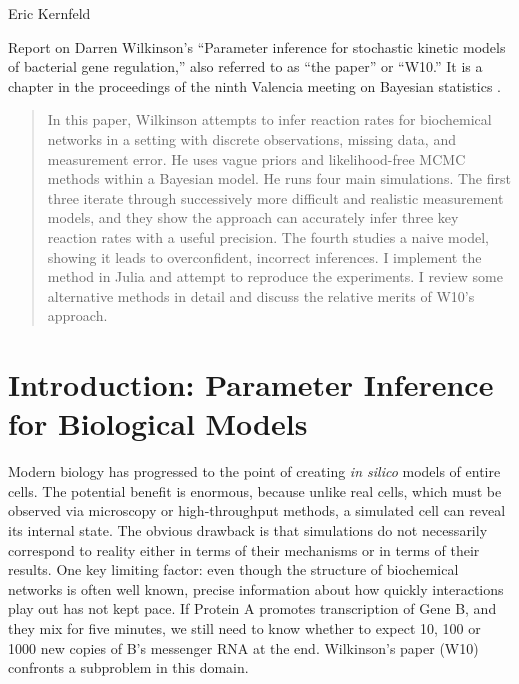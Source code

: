 \documentclass{article}
\begin{document}
Eric Kernfeld

Report on Darren Wilkinson's ``Parameter inference for stochastic kinetic models of bacterial gene regulation,'' also referred to as ``the paper'' or ``W10.'' It is a chapter in the proceedings of the ninth Valencia meeting on Bayesian statistics \cite{Bernardo2012}. 

\begin{abstract}
In this paper, Wilkinson attempts to infer reaction rates for biochemical networks in a setting with discrete observations, missing data, and measurement error. He uses vague priors and likelihood-free MCMC methods within a Bayesian model. He runs four main simulations. The first three iterate through successively more difficult and realistic measurement models, and they show the approach can accurately infer three key reaction rates with a useful precision. The fourth studies a naive model, showing it leads to overconfident, incorrect inferences. I implement the method in Julia and attempt to reproduce the experiments. I review some alternative methods in detail and discuss the relative merits of W10's approach.
\end{abstract}

\tableofcontents
\newpage


\section{Introduction: Parameter Inference for Biological Models}

Modern biology has progressed to the point of creating {\it in silico} models of entire cells. The potential benefit is enormous, because unlike real cells, which must be observed via microscopy or high-throughput methods, a simulated cell can reveal its internal state. The obvious drawback is that simulations do not necessarily correspond to reality either in terms of their mechanisms or in terms of their results. One key limiting factor: even though the structure of biochemical networks is often well known, precise information about how quickly interactions play out has not kept pace. If Protein A promotes transcription of Gene B, and they mix for five minutes, we still need to know whether to expect 10, 100 or 1000 new copies of B's messenger RNA at the end. Wilkinson's paper (W10) confronts a subproblem in this domain.
\end{document}
